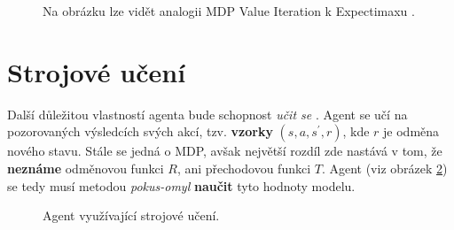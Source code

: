 \begin{figure}[!htbp]
\begin{center}
  \caption{Na obrázku lze vidět analogii MDP Value Iteration k Expectimaxu \cite{RLIntro}.}
  \label{img:mdptree}
\end{center}
\end{figure}
\newpage
\section{Strojové učení}
\label{sec:rl}
Další důležitou vlastností agenta bude schopnost \textit{učit se} \cite{RLIntro}. Agent se učí na pozorovaných výsledcích svých akcí, tzv. \textbf{vzorky} $(s,a,s^\prime,r)$, kde $r$ je odměna nového stavu. Stále se jedná o MDP, avšak největší rozdíl zde nastává v tom, že \textbf{neznáme} odměnovou funkci $R$, ani přechodovou funkci $T$. Agent (viz obrázek \ref{img:learningagent}) se tedy musí metodou \textit{pokus-omyl} \textbf{naučit} tyto hodnoty modelu.

\begin{figure}[!htbp]
\begin{center}
  \caption{Agent využívající strojové učení.}
  \label{img:learningagent}
\end{center}
\end{figure}

